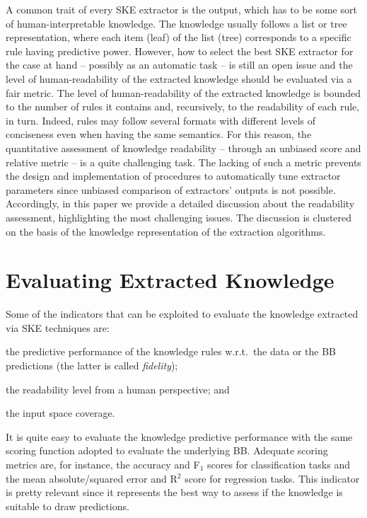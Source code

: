 \documentclass[sigconf]{acmart}
\begin{document}
A common trait of every SKE extractor is the output, which has to be some sort of human-interpretable knowledge.
%
The knowledge usually follows a list or tree representation, where each item (leaf) of the list (tree) corresponds to a specific rule having predictive power.
%
However, how to select the best SKE extractor for the case at hand -- possibly as an automatic task -- is still an open issue and the level of human-readability of the extracted knowledge should be evaluated via a fair metric.
%
The level of human-readability of the extracted knowledge is bounded to the number of rules it contains and, recursively, to the readability of each rule, in turn.
%
Indeed, rules may follow several formats with different levels of conciseness even when having the same semantics.
%
For this reason, the quantitative assessment of knowledge readability -- through an unbiased score and relative metric -- is a quite challenging task.
%
The lacking of such a metric prevents the design and implementation of procedures to automatically tune extractor parameters since unbiased comparison of extractors' outputs is not possible.
%
Accordingly, in this paper we provide a detailed discussion about the readability assessment, highlighting the most challenging issues. The discussion is clustered on the basis of the knowledge representation of the extraction algorithms.

\section{Evaluating Extracted Knowledge}

Some of the indicators that can be exploited to evaluate the knowledge extracted via SKE techniques are:
%
\begin{inlinelist}
	\item the predictive performance of the knowledge rules w.r.t.\ the data or the BB predictions (the latter is called \emph{fidelity});
	\item the readability level from a human perspective; and
	\item the input space coverage.
\end{inlinelist}

It is quite easy to evaluate the knowledge predictive performance with the same scoring function adopted to evaluate the underlying BB.
%
Adequate scoring metrics are, for instance, the accuracy and F$_1$ scores for classification tasks and the mean absolute/squared error and R$^2$ score for regression tasks.
%
This indicator is pretty relevant since it represents the best way to assess if the knowledge is suitable to draw predictions.
\end{document}
